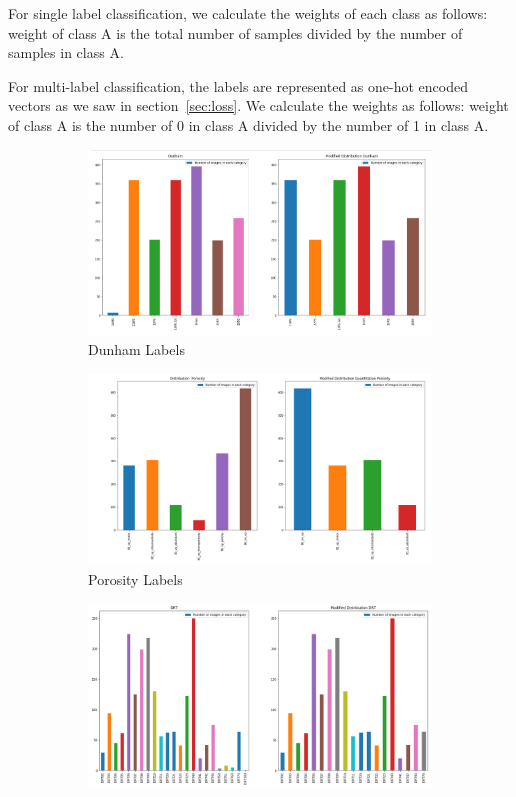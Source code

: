 For single label classification, we calculate the weights of each class as follows: weight of class A is the total number of samples divided by the number of samples in class A.

For multi-label classification, the labels are represented as one-hot encoded vectors as we saw in section~\ref{sec:loss}. We calculate the weights as follows: weight of class A is the number of 0 in class A divided by the number of 1 in class A.

\begin{figure}
\begin{subfigure}{.6\textwidth}
  \centering
  \includegraphics[width=1\linewidth]{figures/03-Dunham.PNG}
  \caption{Dunham Labels}
  \label{fig:dunhamlab}
\end{subfigure}%
\begin{subfigure}{.6\textwidth}
  \centering
  \includegraphics[width=1\linewidth]{figures/03-porosity_baby.PNG}
  \caption{Porosity Labels}
  \label{fig:porolab}
\end{subfigure}
\begin{subfigure}{.6\textwidth}
  \centering
  \includegraphics[width=1\linewidth]{figures/03-DRT.PNG}

\end{subfigure}
\end{figure}
